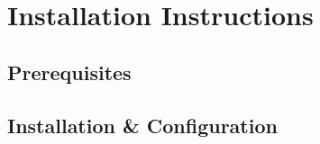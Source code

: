 \chapter{Installation Instructions}

\section*{Prerequisites}

\section*{Installation & Configuration}

